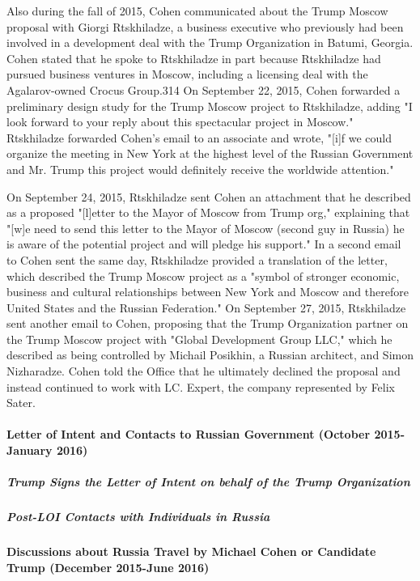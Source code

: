 Also during the fall of 2015, Cohen communicated about the Trump Moscow proposal with Giorgi Rtskhiladze, a business executive who previously had been involved in a development deal with the Trump Organization in Batumi, Georgia.
Cohen stated that he spoke to Rtskhiladze in part because Rtskhiladze had pursued business ventures in Moscow, including a licensing deal with the Agalarov-owned Crocus Group.314 On September 22, 2015, Cohen forwarded a preliminary design study for the Trump Moscow project to Rtskhiladze, adding "I  look forward to your reply about this spectacular project in Moscow."
Rtskhiladze forwarded Cohen's email to an associate and wrote, "[i]f we could organize the meeting in New York at the highest level of the Russian Government and Mr. Trump this project would definitely receive the worldwide attention."

On September 24, 2015, Rtskhiladze sent Cohen an attachment that he described as a proposed "[l]etter to the Mayor of Moscow from Trump org," explaining that "[w]e need to send this letter to the Mayor of Moscow (second guy in Russia) he is aware of the potential project and will pledge his support."
In a second email to Cohen sent the same day, Rtskhiladze provided a translation of the letter, which described the Trump Moscow project as a  "symbol of stronger economic, business and cultural relationships between New York and Moscow and therefore United States and the Russian Federation."
On September 27, 2015, Rtskhiladze sent another email to Cohen, proposing that the Trump Organization partner on the Trump Moscow project with "Global Development Group LLC," which he described as being controlled by Michail Posikhin, a Russian architect, and Simon Nizharadze.
Cohen told the Office that he ultimately declined the proposal and instead continued to work with LC. Expert, the company represented by Felix Sater.

\paragraph{Letter of Intent and Contacts to Russian Government (October 2015-January 2016)}

\subparagraph{Trump Signs the Letter of Intent on behalf of the Trump Organization}

\subparagraph{Post-LOI Contacts with Individuals in Russia}

\paragraph{Discussions about Russia Travel by Michael Cohen or Candidate Trump (December 2015-June 2016)}

